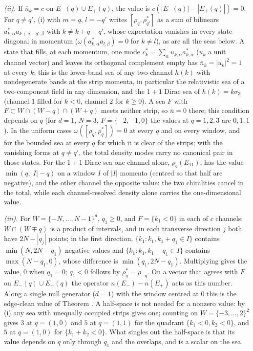 \emph{(ii).} If $\bar n_{k} = c$ on $E_{-}(q) \cup E_{+}(q)$, the value is $c(|E_{-}(q)| - |E_{+}(q)|) = 0$. For $q \ne q'$, (i) with $m = q$, $l = -q'$ writes $[\rho_{q}, \rho_{q'}^{*}]$ as a sum of bilinears $a_{k,\alpha}^{*}a_{k+q-q',\beta}$ with $k \ne k + q - q'$, whose expectation vanishes in every state diagonal in momentum ($\omega(a_{k,\alpha}^{*}a_{l,\beta}) = 0$ for $k \ne l$), as are all the seas below. A state that fills, at each momentum, one mode $c_{k}^{*} = \sum_{\alpha}u_{k,\alpha}a_{k,\alpha}^{*}$ ($u_{k}$ a unit channel vector) and leaves its orthogonal complement empty has $\bar n_{k} = |u_{k}|^{2} = 1$ at every $k$; this is the lower-band sea of any two-channel $h(k)$ with nondegenerate bands at the strip momenta, in particular the relativistic sea of a two-component field in any dimension, and the $1 + 1$ Dirac sea of $h(k) = k\sigma_{3}$ (channel $1$ filled for $k < 0$, channel $2$ for $k \ge 0$). A sea $F$ with $F \subset W \cap (W - q) \cap (W + q)$ meets neither strip, so $\bar n = 0$ there; this condition depends on $q$ (for $d = 1$, $N = 3$, $F = \{-2, -1, 0\}$ the values at $q = 1, 2, 3$ are $0, 1, 1$). In the uniform cases $\omega([\rho_{q}, \rho_{q}^{*}]) = 0$ at every $q$ and on every window, and for the bounded sea at every $q$ for which it is clear of the strips; with the vanishing forms at $q \ne q'$, the total density modes carry no canonical pair in those states. For the $1 + 1$ Dirac sea one channel alone, $\rho_{q}(E_{11})$, has the value $\min(q, |I| - q)$ on a window $I$ of $|I|$ momenta (centred so that half are negative), and the other channel the opposite value: the two chiralities cancel in the total, while each channel-resolved density alone carries the one-dimensional value.

\emph{(iii).} For $W = \{-N, \dots, N - 1\}^{d}$, $q_{1} \ge 0$, and $F = \{k_{1} < 0\}$ in each of $c$ channels: $W \cap (W \mp q)$ is a product of intervals, and in each transverse direction $j$ both have $2N - |q_{j}|$ points; in the first direction, $\{k_{1} : k_{1}, k_{1} + q_{1} \in I\}$ contains $\min(N, 2N - q_{1})$ negative values and $\{k_{1} : k_{1}, k_{1} - q_{1} \in I\}$ contains $\max(N - q_{1}, 0)$, whose difference is $\min(q_{1}, 2N - q_{1})$. Multiplying gives the value, $0$ when $q_{1} = 0$; $q_{1} < 0$ follows by $\rho_{q}^{*} = \rho_{-q}$. On a vector that agrees with $F$ on $E_{-}(q) \cup E_{+}(q)$ the operator $n(E_{-}) - n(E_{+})$ acts as this number. Along a single null generator ($d = 1$) with the window centred at $0$ this is the edge-clean value of Theorem . A half-space is not needed for a nonzero value: by (i) any sea with unequally occupied strips gives one; counting on $W = \{-3, \dots, 2\}^{2}$ gives $3$ at $q = (1, 0)$ and $5$ at $q = (1, 1)$ for the quadrant $\{k_{1} < 0, k_{2} < 0\}$, and $5$ at $q = (1, 0)$ for $\{k_{1} + k_{2} < 0\}$. What singles out the half-space is that its value depends on $q$ only through $q_{1}$ and the overlaps, and is a scalar on the sea.

